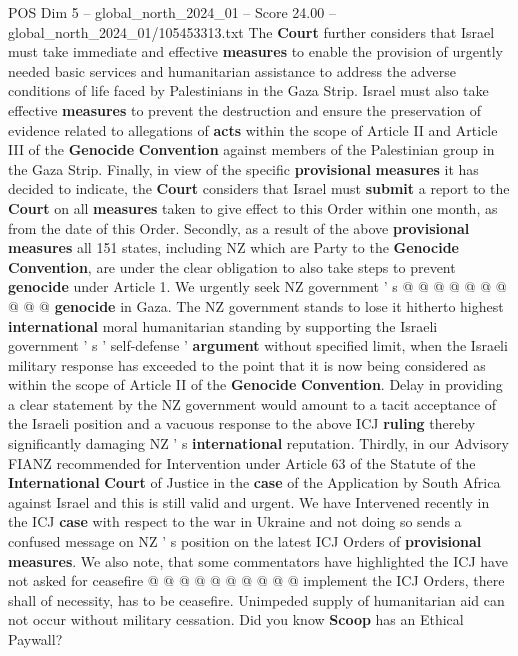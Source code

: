 \begin{textsample}{POS Dim 5 – global\_north\_2024\_01 – Score 24.00 – global\_north\_2024\_01/105453313.txt}
The \textbf{Court} further considers that Israel must take immediate and effective \textbf{measures} to enable the provision of urgently needed basic services and humanitarian assistance to address the adverse conditions of life faced by Palestinians in the Gaza Strip.
Israel must also take effective \textbf{measures} to prevent the destruction and ensure the preservation of evidence related to allegations of \textbf{acts} within the scope of Article II and Article III of the \textbf{Genocide} \textbf{Convention} against members of the Palestinian group in the Gaza Strip.
Finally, in view of the specific \textbf{provisional} \textbf{measures} it has decided to indicate, the \textbf{Court} considers that Israel must \textbf{submit} a report to the \textbf{Court} on all \textbf{measures} taken to give effect to this Order within one month, as from the date of this Order.
Secondly, as a result of the above \textbf{provisional} \textbf{measures} all 151 states, including NZ which are Party to the \textbf{Genocide} \textbf{Convention}, are under the clear obligation to also take steps to prevent \textbf{genocide} under Article 1.
We urgently seek NZ government ' s @ @ @ @ @ @ @ @ @ @ \textbf{genocide} in Gaza.
The NZ government stands to lose it hitherto highest \textbf{international} moral humanitarian standing by supporting the Israeli government ' s ' self-defense ' \textbf{argument} without specified limit, when the Israeli military response has exceeded to the point that it is now being considered as within the scope of Article II of the \textbf{Genocide} \textbf{Convention}.
Delay in providing a clear statement by the NZ government would amount to a tacit acceptance of the Israeli position and a vacuous response to the above ICJ \textbf{ruling} thereby significantly damaging NZ ' s \textbf{international} reputation.
Thirdly, in our Advisory FIANZ recommended for Intervention under Article 63 of the Statute of the \textbf{International} \textbf{Court} of Justice in the \textbf{case} of the Application by South Africa against Israel and this is still valid and urgent.
We have Intervened recently in the ICJ \textbf{case} with respect to the war in Ukraine and not doing so sends a confused message on NZ ' s position on the latest ICJ Orders of \textbf{provisional} \textbf{measures}.
We also note, that some commentators have highlighted the ICJ have not asked for ceasefire @ @ @ @ @ @ @ @ @ @ implement the ICJ Orders, there shall of necessity, has to be ceasefire.
Unimpeded supply of humanitarian aid can not occur without military cessation.
Did you know \textbf{Scoop} has an Ethical Paywall?

\end{textsample}
